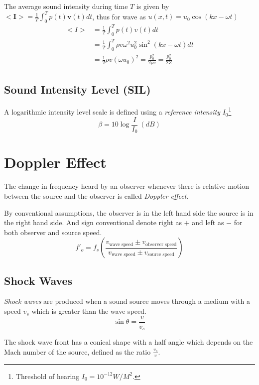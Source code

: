 \documentclass[UTF8]{book}
\begin{document}
The average sound intensity during time $T$ is given by $<\mathbf{I}>=\frac{1}{T}\int _{0}^{T}p(t)\mathbf{v}(t)dt$, thus for wave as $u(x,t)=u_0\cos (kx-\omega t)$
\begin{align*}
<I>&=\frac{1}{T}\int _{0}^{T}p(t)v(t)dt\\
&=\frac{1}{T}\int _{0}^{T}\rho v\omega ^2u_0^2\sin ^2(kx-\omega t)dt\\
&=\frac{1}{2}\rho v(\omega u_0)^2=\frac{p_0^2}{2\rho v}=\frac{p_0^2}{2Z}
\end{align*}
\subsection{Sound Intensity Level (SIL)}
A logarithmic intensity level scale is defined using a \emph{reference intensity} $I_0$\footnote{Threshold of hearing $I_0=10^{-12}W/M^2$.}
\begin{equation}
\beta =10\log \frac{I}{I_0}\ (dB)
\end{equation}


\section{Doppler Effect}
The change in frequency heard by an observer whenever there is relative motion between the source and the observer is called \emph{Doppler effect}.

By conventional assumptions, the observer is in the left hand side the source is in the right hand side. And sign conventional denote right as $+$ and left as $-$ for both observer and source speed.
\begin{equation}\label{eq:doppler effect}
f'_o=f_s\left(\frac{v_{\text{wave speed}}\pm v_{\text{observer speed}}}{v_{\text{wave speed}}\pm v_{\text{source speed}}}\right)
\end{equation}


\subsection{Shock Waves}
\emph{Shock waves} are produced when a sound source moves through a medium with a speed $v_s$ which is greater than the wave speed.
\[\sin \theta =\frac{v}{v_s}\]

The shock wave front has a conical shape with a half angle which depends on the Mach number of the source, defined as the ratio $\frac{v_s}{v}$.
\end{document}
